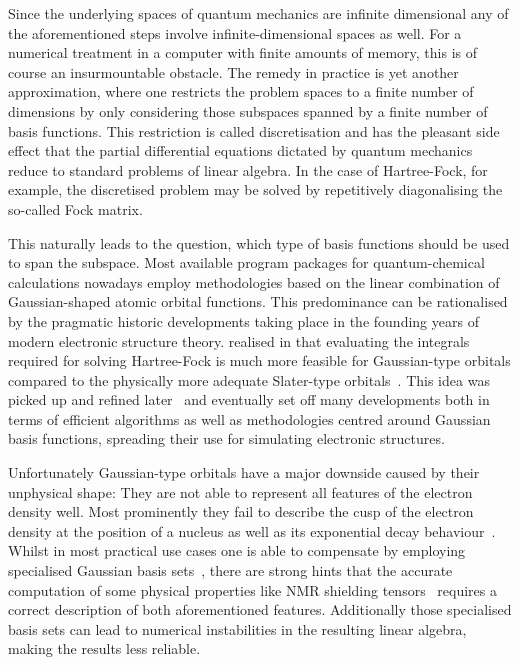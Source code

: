 Since the underlying spaces of quantum mechanics are infinite dimensional
any of the aforementioned steps
involve infinite-dimensional spaces as well.
For a numerical treatment in a computer with finite amounts of memory,
this is of course an insurmountable obstacle.
The remedy in practice is yet another approximation,
where one restricts the problem spaces
to a finite number of dimensions by only considering
those subspaces
spanned by a finite number of basis functions.
This restriction is called discretisation
and has the pleasant side effect that the partial differential equations
dictated by quantum mechanics
reduce to standard problems of linear algebra.
In the case of Hartree-Fock, for example,
the discretised problem may be solved by repetitively diagonalising
the so-called Fock matrix.

This naturally leads to the question,
which type of basis functions should be used to span the subspace.
Most available program packages for
quantum-chemical calculations nowadays employ methodologies based on
the linear combination of Gaussian-shaped atomic orbital functions.
This predominance can be rationalised
by the pragmatic historic developments
taking place in the founding years of modern electronic structure theory.
\citet{Boys1950} realised in \citeyear{Boys1950}
that evaluating the integrals
required for solving Hartree-Fock
is much more feasible for Gaussian-type orbitals
compared to the physically more adequate Slater-type orbitals~\cite{Slater1930}.
This idea was picked up and refined later~\cite{Hehre1969}
and eventually set off many developments
both in terms of efficient algorithms as well as methodologies
centred around Gaussian basis functions,
spreading their use for simulating electronic structures.

Unfortunately Gaussian-type orbitals have a major downside
caused by their unphysical shape:
They are not able to represent
all features of the electron density well.
Most prominently they fail to describe the cusp of the electron density
at the position of a nucleus as well as its exponential decay behaviour~\cite{Kato1957}.
Whilst in most practical use cases one is able to compensate
by employing specialised Gaussian basis sets~\cite{Jensen2013,Hill2013},
there are strong hints that the accurate computation of some physical properties
like NMR shielding tensors~\cite{Guell2008,Hoggan2009}
requires a correct description of both aforementioned features.
Additionally those specialised basis sets can lead to
numerical instabilities in the resulting linear algebra,
making the results less reliable.

